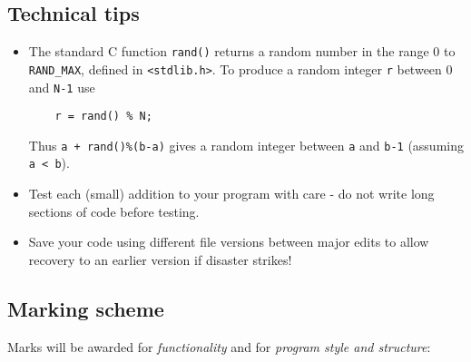 \documentclass[a4paper]{article}
\begin{document}
{\subsection{Technical tips}\label{technical}
\begin{itemize}
\item The standard C function {\tt rand()} returns a random number in
  the range 0 to {\tt RAND\_MAX}, defined in {\tt <stdlib.h>}.  To
  produce a random integer {\tt r} between 0 and {\tt N-1} use
\begin{verbatim}
    r = rand() % N;
\end{verbatim}
  Thus \texttt{a + rand()\%(b-a)} gives a random integer between
  \texttt{a} and \texttt{b-1} (assuming \texttt{a < b}).
\item Test each (small) addition to your program with care - do not
  write long sections of code before testing.

\item Save your code using different file versions between major edits
  to allow recovery to an earlier version if disaster strikes!
\end{itemize}

\clearpage
\subsection{Marking scheme}\label{progMrkg}
Marks will be awarded for \emph{functionality} and for \emph{program
  style and structure}:

}
\end{document}

